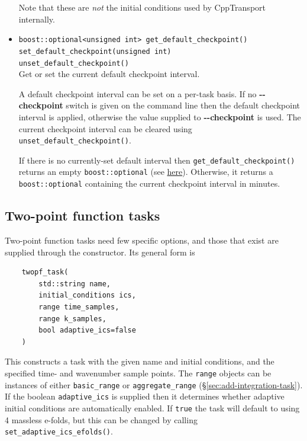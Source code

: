 \documentclass[11pt,a4paper]{article}
\newcommand{\packagefont}{\sffamily}
\newcommand{\CppTransport}{{\packagefont CppTransport}}
\newcommand{\option}[1]{{\ttfamily\bfseries\small #1}}
\begin{document}
\begin{itemize}
    Note that these are \emph{not} the initial conditions used
    by {\CppTransport} internally.
    
    \item \texttt{boost::optional<unsigned int> get_default_checkpoint()} \\
    \texttt{set_default_checkpoint(unsigned int)} \\
    \texttt{unset_default_checkpoint()} \\
    Get or set the current default checkpoint interval.
    
    A default checkpoint interval can be set on a per-task basis.
    If no \option{{-}{-}checkpoint} switch is given on the command line then
    the default checkpoint interval is applied, otherwise the value
    supplied to \option{{-}{-}checkpoint} is used.
    The current checkpoint interval can be cleared
    using
    \texttt{unset_default_checkpoint()}.
    
    If there is no currently-set default interval then
    \texttt{get_default_checkpoint()} returns an empty
    \texttt{boost::optional}
    (see \href{http://www.boost.org/doc/libs/1_60_0/libs/optional/doc/html/index.html}{here}).
    Otherwise, it returns a
    \texttt{boost::optional} containing the current
    checkpoint interval in minutes.
    
\end{itemize}

\subsection{Two-point function tasks}
\label{sec:twopf-options}
Two-point function tasks need few specific options, and those that exist are supplied
through the constructor. Its general form is
\begin{verbatim}
    twopf_task(
        std::string name,
        initial_conditions ics,
        range time_samples,
        range k_samples,
        bool adaptive_ics=false
    )
\end{verbatim}
This constructs a task with the given name and initial conditions,
and the specified time- and wavenumber sample points.
The \texttt{range} objects can be instances of either
\texttt{basic_range}
or
\texttt{aggregate_range}
(\S\ref{sec:add-integration-task}).
If the boolean
\texttt{adaptive_ics} is supplied then it determines whether adaptive initial conditions
are automatically enabled.
If \texttt{true} the task will default to using 4 massless e-folds, but this can be
changed by calling \texttt{set_adaptive_ics_efolds()}.
\end{document}
